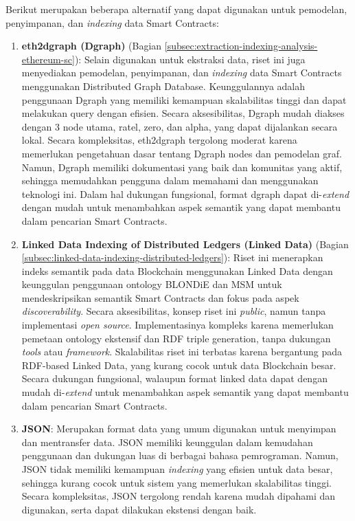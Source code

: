 Berikut merupakan beberapa alternatif yang dapat digunakan untuk pemodelan, penyimpanan, dan \textit{indexing} data Smart Contracts:
\begin{enumerate}
    \item \textbf{eth2dgraph (Dgraph)} \parencite{aimar2023extraction} (Bagian \ref{subsec:extraction-indexing-analysis-ethereum-sc}): Selain digunakan untuk ekstraksi data, riset ini juga menyediakan pemodelan, penyimpanan, dan \textit{indexing} data Smart Contracts menggunakan Distributed Graph Database. Keunggulannya adalah penggunaan Dgraph yang memiliki kemampuan skalabilitas tinggi dan dapat melakukan query dengan efisien. Secara aksesibilitas, Dgraph mudah diakses dengan 3 node utama, ratel, zero, dan alpha, yang dapat dijalankan secara lokal. Secara kompleksitas, eth2dgraph tergolong moderat karena memerlukan pengetahuan dasar tentang Dgraph nodes dan pemodelan graf. Namun, Dgraph memiliki dokumentasi yang baik dan komunitas yang aktif, sehingga memudahkan pengguna dalam memahami dan menggunakan teknologi ini. Dalam hal dukungan fungsional, format dgraph dapat di-\textit{extend} dengan mudah untuk menambahkan aspek semantik yang dapat membantu dalam pencarian Smart Contracts.
    
    \item \textbf{Linked Data Indexing of Distributed Ledgers (Linked Data)} \parencite{third2017linked} (Bagian \ref{subsec:linked-data-indexing-distributed-ledgers}): Riset ini menerapkan indeks semantik pada data Blockchain menggunakan Linked Data dengan keunggulan penggunaan ontology BLONDiE dan MSM untuk mendeskripsikan semantik Smart Contracts dan fokus pada aspek \textit{discoverability}. Secara aksesibilitas, konsep riset ini \textit{public}, namun tanpa implementasi \textit{open source}. Implementasinya kompleks karena memerlukan pemetaan ontology ekstensif dan RDF triple generation, tanpa dukungan \textit{tools} atau \textit{framework}. Skalabilitas riset ini terbatas karena bergantung pada RDF-based Linked Data, yang kurang cocok untuk data Blockchain besar. Secara dukungan fungsional, walaupun format linked data dapat dengan mudah di-\textit{extend} untuk menambahkan aspek semantik yang dapat membantu dalam pencarian Smart Contracts.
    
    \item \textbf{JSON}: Merupakan format data yang umum digunakan untuk menyimpan dan mentransfer data. JSON memiliki keunggulan dalam kemudahan penggunaan dan dukungan luas di berbagai bahasa pemrograman. Namun, JSON tidak memiliki kemampuan \textit{indexing} yang efisien untuk data besar, sehingga kurang cocok untuk sistem yang memerlukan skalabilitas tinggi. Secara kompleksitas, JSON tergolong rendah karena mudah dipahami dan digunakan, serta dapat dilakukan ekstensi dengan baik.
    

\end{enumerate}
